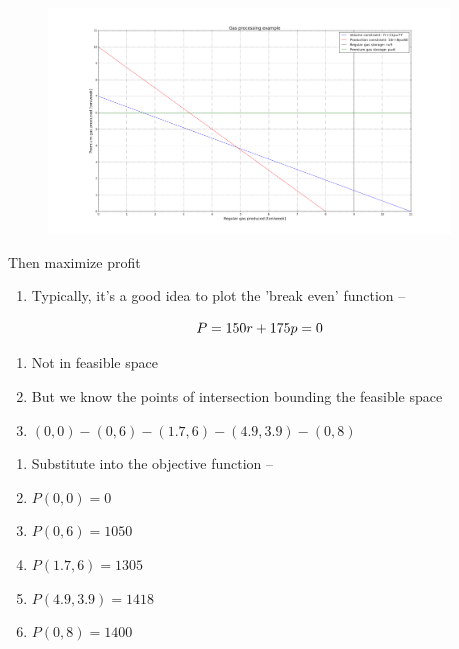 \documentclass[aspectratio=1610,pdftex,dvipsnames,compress,xcolor={dvipsnames}]{beamer}
\begin{document}
\begin{frame}{}
    \begin{figure}
        \centering
        \includegraphics[width=0.95\textwidth]{gas.storage.jpg}
    \end{figure}
\end{frame}


\begin{frame}{Then maximize profit}
    \begin{enumerate}[series=outerlist,topsep=0pt,itemsep=1pt,leftmargin=*,label=(\arabic*)]
        \item[]Typically, it's a good idea to plot the 'break even' function --
    \end{enumerate}

    \vspace*{\fill}

    \begin{equation}
        \LARGE
        P = 150r +175p = 0
    \end{equation}

    \vspace*{\fill}

    \begin{enumerate}[series=outerlist,topsep=0pt,itemsep=1pt,leftmargin=*,label=(\arabic*)]
        \item[]Not in feasible space
            \vspace{0.05in}
        \item[]But we know the points of intersection bounding the feasible space
        \item[]$(0,0) - (0,6) - (1.7,6) - (4.9,3.9) - (0,8)$
    \end{enumerate}

    \begin{enumerate}[series=outerlist,topsep=9pt,itemsep=5pt,leftmargin=*,label=(\arabic*)]
        \item[]Substitute into the objective function --
        \item[]$P(0,0) = 0$
        \item[]$P(0,6) = 1050$
        \item[]$P(1.7,6) = 1305$
        \item[]$P(4.9,3.9) = 1418$ 
        \item[]$P(0,8) = 1400$
    \end{enumerate}
\end{frame}
\end{document}
